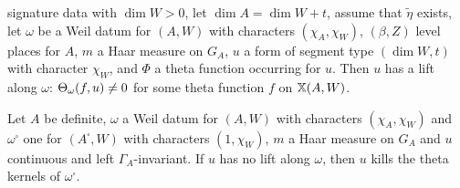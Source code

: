 \begin{definition}
\begin{enumerate}[label=(\alph*)]
signature data with $\dim W>0$, let $\dim A=\dim W+t$, assume that $\tilde\eta$ exists, let $\omega$ be a Weil datum for $(A,W)$ with characters
$(\chi_A,\chi_W)$, $(\beta,Z)$ level places for $A$, $m$ a Haar measure on $G_A$, $u$ a form of segment type $(\dim W,t)$ with character $\chi_W$, and
$\Phi$ a theta function occurring for $u$. Then $u$ has a lift along $\omega$: $\Theta_\omega(f,u)\ne0$ for some theta function $f$ on
$\mathbb{X}(A,W)$.
\end{enumerate}
\end{definition}

\begin{lemma}\label{pf:liftinj:kills}
Let $A$ be definite, $\omega$ a Weil datum for $(A,W)$ with characters $(\chi_A,\chi_W)$ and $\omega^\square$ one for $(A^\square,W)$ with
characters $(1,\chi_W)$, $m$ a Haar measure on $G_A$ and $u$ continuous and left $\Gamma_A$-invariant. If $u$ has no lift along
$\omega$, then $u$ kills the theta kernels of $\omega^\square$.
\end{lemma}

